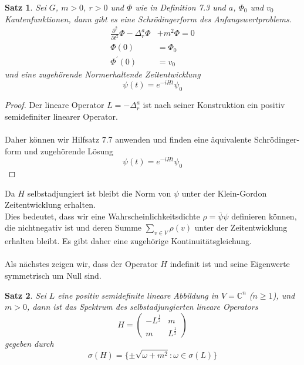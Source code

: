 \documentclass[11pt,a4paper,leqno]{report}
\newtheorem{proposition}{Satz}[chapter]
\numberwithin{equation}{chapter}
\begin{document}
\begin{proposition}
	Sei $G$, $m>0$, $r>0$ und $\Phi$ wie in Definition 7.3 und $a$, $\Phi_0$ und $v_0$ Kantenfunktionen, dann gibt es eine Schrödingerform des Anfangswertproblems.
	\begin{align}
		\frac{\partial^2}{\partial t^2}\Phi - \Delta^{a}_r\Phi&+ m^2 \Phi = 0\\
		\Phi(0)&=\Phi_0\\
		\Phi^\prime(0)&=v_0
	\end{align}
	und eine zugeh\"orende Normerhaltende Zeitentwicklung
	\begin{equation*}
		\psi(t) = e^{-i Ht}\psi_0
	\end{equation*} 
\end{proposition}
\begin{proof}
	Der lineare Operator $L = - \Delta^{a}_r$ ist nach seiner Konstruktion ein positiv semidefiniter linearer Operator.\\
	\\
	Daher k\"onnen wir Hilfsatz 7.7 anwenden und finden eine \"aquivalente Schr\"odinger-form und zugeh\"orende L\"osung 
	\begin{equation*}
		\psi(t) = e^{-i Ht}\psi_0
	\end{equation*} 
\end{proof}
\noindent
Da $H$ selbstadjungiert ist bleibt die Norm von $\psi$ unter der Klein-Gordon Zeitentwicklung erhalten.\\
Dies bedeutet, dass wir eine Wahrscheinlichkeitsdichte $\rho=\overline{\psi}\psi$ definieren k\"onnen, die nichtnegativ ist und deren Summe $\sum_{v\in V}\rho(v)$ unter der Zeitentwicklung erhalten bleibt. Es gibt daher eine zugeh\"orige Kontinuit\"atsgleichung. \\
\\
Als n\"achstes zeigen wir, dass der Operator $H$ indefinit ist und seine Eigenwerte symmetrisch um Null sind.
\begin{proposition}
	Sei $L$ eine positiv semidefinite lineare Abbildung in $V=\mathbb{C}^n$ ($n\geq 1$), und $m>0$, dann ist das Spektrum des selbstadjungierten lineare Operators
	\begin{equation}
		H=\begin{pmatrix}
			-L^\frac{1}{2} & m \\ 
			m & L^\frac{1}{2}
		\end{pmatrix}
	\end{equation} 
	gegeben durch 
		\begin{equation}
		\sigma(H)= \{\pm\sqrt{\omega+m^2}:\omega\in \sigma(L)\}
	\end{equation} 
\end{proposition}
\end{document}
